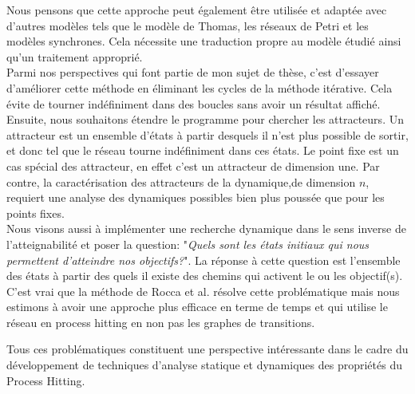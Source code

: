 Nous pensons que cette approche peut également être utilisée et adaptée avec d'autres modèles tels que le modèle de Thomas, les réseaux de Petri et les modèles synchrones. Cela nécessite une traduction propre au modèle étudié ainsi qu'un traitement approprié.\\
Parmi nos perspectives qui font partie de mon sujet de thèse, c'est d'essayer d'améliorer cette méthode en éliminant les cycles de la méthode itérative. Cela évite de tourner indéfiniment dans des boucles sans avoir un résultat affiché.\\ 

Ensuite, nous souhaitons étendre le programme pour chercher les attracteurs. Un attracteur est un ensemble d'états à partir desquels il n'est plus possible de sortir, et donc tel que le réseau tourne indéfiniment dans ces états. Le point fixe est un cas spécial des attracteur, en effet c'est un attracteur de dimension une. Par contre, la caractérisation des attracteurs  de la dynamique,de dimension $n$, requiert une analyse des dynamiques possibles bien plus poussée que pour les points fixes.\\
Nous visons aussi à implémenter une recherche dynamique dans le sens inverse de l'atteignabilité et poser la question: "\textit{Quels sont les états initiaux qui nous permettent d'atteindre nos objectifs?}".  La réponse à cette question est l'ensemble des états à partir des quels il existe des chemins qui activent le ou les objectif(s). C'est vrai que la méthode de Rocca et al. résolve cette problématique mais nous estimons à avoir une approche plus efficace en terme de temps et qui utilise le réseau en process hitting en non pas les graphes de transitions.

Tous ces problématiques constituent une perspective intéressante dans le cadre du développement de techniques d'analyse statique et dynamiques des propriétés du Process Hitting.\\